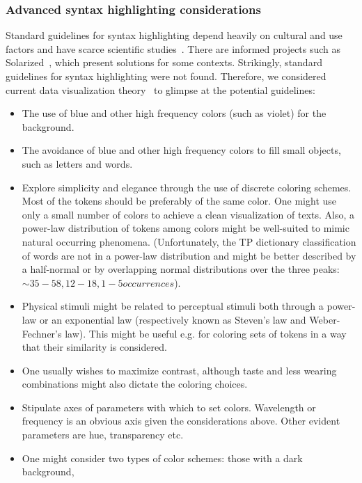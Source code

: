 \documentclass{article}
\begin{document}

\subsubsection{Advanced syntax highlighting considerations}
Standard guidelines for syntax highlighting
depend heavily on cultural and use factors
and have scarce scientific studies~\cite{stack}.
There are informed projects such as Solarized~\cite{solazired},
which present solutions for some contexts.
Strikingly, standard guidelines for syntax highlighting were not found.
Therefore, we considered current data visualization
theory~\cite{dv1,dv2,dv3,dv4} to glimpse at the potential guidelines:
\begin{itemize}
  \item The use of blue and other high frequency colors (such as
    violet) for the background.
  \item The avoidance of blue and other high frequency
  colors to fill small objects, such as letters and words.
  \item Explore simplicity and elegance through the use of discrete
  coloring schemes. Most of the tokens should be preferably of
  the same color.
    One might use only a small number of colors to achieve a clean
    visualization of texts.
  Also, a power-law distribution of tokens among colors might be
    well-suited to mimic natural occurring phenomena.
    (Unfortunately, the TP dictionary classification of words are not in a
    power-law distribution and might be better described by a half-normal or by
overlapping normal distributions over the three peaks: $\sim35-58,
12-18, 1-5 occurrences$).
  \item Physical stimuli might be related to perceptual stimuli both 
    through a power-law or an exponential law (respectively known
    as Steven's law and Weber-Fechner's law).
    This might be useful e.g. for coloring sets of tokens in
    a way that their similarity is considered.
  \item One usually wishes to maximize contrast,
  although taste and less wearing combinations might
  also dictate the coloring choices.
  \item Stipulate axes of parameters with which to set colors.
  Wavelength or frequency is an obvious axis given the considerations
  above.
  Other evident parameters are hue, transparency etc.
  \item One might consider two types of color schemes: those with a dark background,

\end{itemize}
\end{document}
